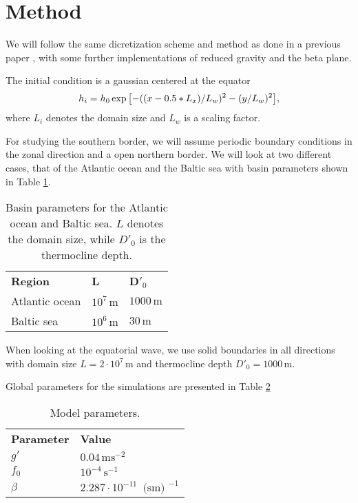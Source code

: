 \section{Method}
\label{sec:method}
We will follow the same dicretization scheme and method as done in a previous paper \citep{lab1}, with some further implementations of reduced gravity and the beta plane.

The initial condition is a gaussian centered at the equator
	\begin{equation}
		h_i = h_0\exp\qty[-((x - 0.5*L_x)/L_w)^2 - (y/L_w)^2],
	\end{equation}
where $L_i$ denotes the domain size and $L_w$ is a scaling factor.

For studying the southern border, we will assume periodic boundary conditions in the zonal direction and a open northern border. We will look at two different cases, that of the Atlantic ocean and the Baltic sea with basin parameters shown in Table \ref{tab:southernborder}.
	\begin{table}[htbp]
		\begin{tabular}{lll}
			\textbf{Region} & \textbf{L}  & \textbf{D}$'_0$  \\
			Atlantic ocean & $10^7\, \text{m}$  & $1000\, \text{m}$  \\
			Baltic sea & $10^6\, \text{m}$ & $30\, \text{m}$ 
		\end{tabular}
		\caption{Basin parameters for the Atlantic ocean and Baltic sea. $L$ denotes the domain size, while $D'_0$ is the thermocline depth.}
		\label{tab:southernborder}
	\end{table}

When looking at the equatorial wave, we use solid boundaries in all directions with domain size $L = 2 \cdot 10^7\, \text{m}$ and thermocline depth $D'_0 = 1000\, \text{m}$.

Global parameters for the simulations are presented in Table \ref{tab:parameters}
	\begin{table}[htbp]
		\begin{tabular}{ll}
			\textbf{Parameter} & \textbf{Value} \\
			$ g' $ & $ 0.04 \, \text{m}\text{s}^{-2} $ \\
			$ f_0 $ & $ 10^{-4} \, \text{s}^{-1}$ \\
			$ \beta $ & $ 2.287 \cdot 10^{-11} \, \text{ (sm) }^{-1}  $
		\end{tabular}
		\caption{Model parameters.}
		\label{tab:parameters}
	\end{table}